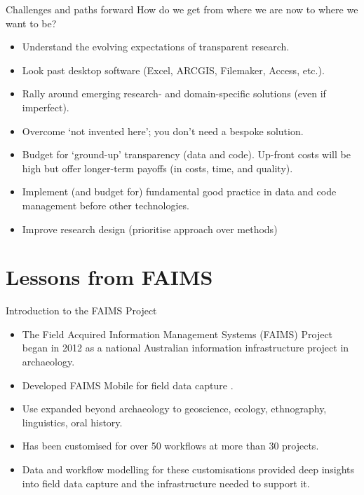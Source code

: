 \documentclass[aspectratio=169, 12pt]{beamer} %
\begin{document}
\begin{frame}{Challenges and paths forward}
  How do we get from where we are now to where we want to be?
      \begin{itemize}[label=\textbullet]
        \item Understand the evolving expectations of transparent research. 
        \item Look past desktop software (Excel, ARCGIS, Filemaker, Access, etc.).
        \item Rally around emerging research- and domain-specific solutions (even if imperfect).
        \item Overcome `not invented here'; you don't need a bespoke solution.
        \item Budget for `ground-up' transparency (data and code). Up-front costs will be high but offer longer-term payoffs (in costs, time, and quality).
        \item Implement (and budget for) fundamental good practice in data and code management before other technologies.
        \item Improve research design (prioritise approach over methods) \cite{Muthukrishna2019-kt, Hole1973-cy}
    \end{itemize}
\end{frame}

\section{Lessons from FAIMS}

\begin{frame}{Introduction to the FAIMS Project}
    \begin{itemize}[label=\textbullet]
        \item The Field Acquired Information Management Systems (FAIMS) Project began in 2012 as a national Australian information infrastructure project in archaeology.
        \item Developed FAIMS Mobile for field data capture \cite{Ballsun-Stanton2018-zd}.
        \item Use expanded beyond archaeology to geoscience, ecology, ethnography, linguistics, oral history.
        \item Has been customised for over 50 workflows at more than 30 projects. 
        \item Data and workflow modelling for these customisations provided deep insights into field data capture and the infrastructure needed to support it.
    \end{itemize}
\end{frame}
\end{document}
